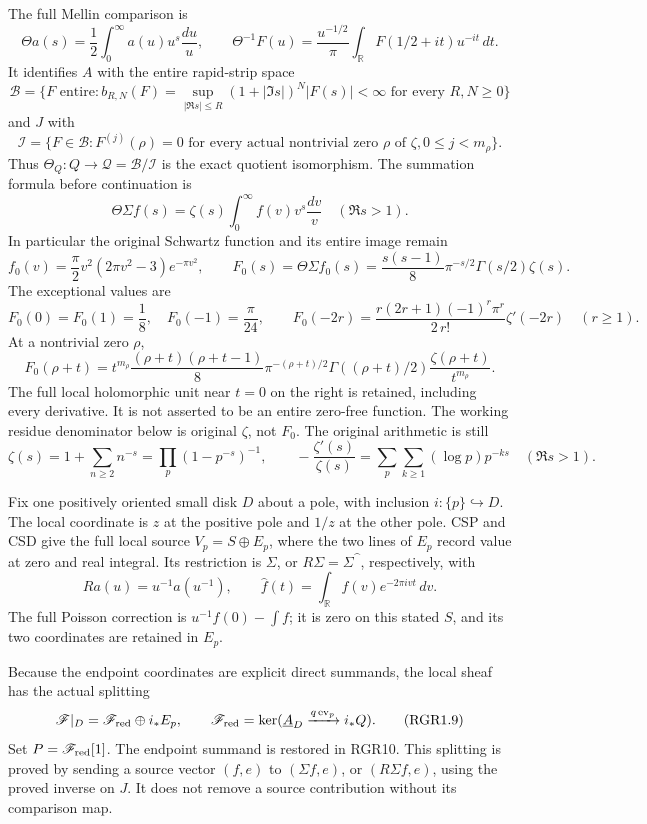 The full Mellin comparison is \[
 \Theta a(s)=\frac12\int_0^\infty a(u)u^s\frac{du}{u},\qquad
 \Theta^{-1}F(u)=\frac{u^{-1/2}}\pi
 \int_{\mathbb R}F(1/2+it)u^{-it}\,dt.
 \tag{RGR1.2}
\] It identifies \(A\) with the entire rapid-strip space \[
 \mathcal B=\{F\text{ entire}:b_{R,N}(F)
 =\sup_{|\Re s|\le R}(1+|\Im s|)^N|F(s)|<\infty
 \text{ for every }R,N\ge0\}
\] and \(J\) with \[
 \mathcal I=\{F\in\mathcal B:F^{(j)}(\rho)=0\text{ for every actual
 nontrivial zero }\rho\text{ of }\zeta, 0\le j<m_\rho\}.
 \tag{RGR1.3}
\] Thus \(\Theta_Q:Q\to\mathcal Q=\mathcal B/\mathcal I\) is the exact
quotient isomorphism. The summation formula before continuation is \[
 \Theta\Sigma f(s)=\zeta(s)\int_0^\infty f(v)v^s\frac{dv}{v}
 \quad(\Re s>1).
 \tag{RGR1.4}
\] In particular the original Schwartz function and its entire image
remain \[
 f_0(v)=\frac\pi2v^2(2\pi v^2-3)e^{-\pi v^2},\qquad
 F_0(s)=\Theta\Sigma f_0(s)
 =\frac{s(s-1)}8\pi^{-s/2}\Gamma(s/2)\zeta(s).
 \tag{RGR1.5}
\] The exceptional values are \[
 F_0(0)=F_0(1)=\frac18,\quad F_0(-1)=\frac\pi{24},\qquad
 F_0(-2r)=\frac{r(2r+1)(-1)^r\pi^r}{2\,r!}\zeta'(-2r)
 \quad(r\ge1).
 \tag{RGR1.6}
\] At a nontrivial zero \(\rho\), \[
 F_0(\rho+t)=t^{m_\rho}
 \frac{(\rho+t)(\rho+t-1)}8\pi^{-(\rho+t)/2}
 \Gamma((\rho+t)/2)\frac{\zeta(\rho+t)}{t^{m_\rho}}.
 \tag{RGR1.7}
\] The full local holomorphic unit near \(t=0\) on the right is
retained, including every derivative. It is not asserted to be an entire
zero-free function. The working residue denominator below is original
\(\zeta\), not \(F_0\). The original arithmetic is still \[
 \zeta(s)=1+\sum_{n\ge2}n^{-s}=\prod_p(1-p^{-s})^{-1},\qquad
 -\frac{\zeta'(s)}{\zeta(s)}
 =\sum_p\sum_{k\ge1}(\log p)p^{-ks}\quad(\Re s>1).
 \tag{RGR1.8}
\]

Fix one positively oriented small disk \(D\) about a pole, with
inclusion \(i:\{p\}\hookrightarrow D\). The local coordinate is \(z\) at
the positive pole and \(1/z\) at the other pole. CSP and CSD give the
full local source \(V_p=S\oplus E_p\), where the two lines of \(E_p\)
record value at zero and real integral. Its restriction is \(\Sigma\),
or \(R\Sigma=\Sigma\widehat{\phantom f}\), respectively, with \[
 Ra(u)=u^{-1}a(u^{-1}),\qquad
 \widehat f(t)=\int_{\mathbb R}f(v)e^{-2\pi ivt}\,dv.
\] The full Poisson correction is \(u^{-1}f(0)-\int f\); it is zero on
this stated \(S\), and its two coordinates are retained in \(E_p\).

Because the endpoint coordinates are explicit direct summands, the local
sheaf has the actual splitting \[
 \mathscr F|_D=\mathscr F_{\rm red}\oplus i_*E_p,
 \qquad
 \mathscr F_{\rm red}=\ker(\underline A_D\xrightarrow{q\,\mathrm{ev}_p}i_*Q).
 \tag{RGR1.9}
\] Set \(P=\mathscr F_{\rm red}[1]\). The endpoint summand is restored
in RGR10. This splitting is proved by sending a source vector \((f,e)\)
to \((\Sigma f,e)\), or \((R\Sigma f,e)\), using the proved inverse on
\(J\). It does not remove a source contribution without its comparison
map.

